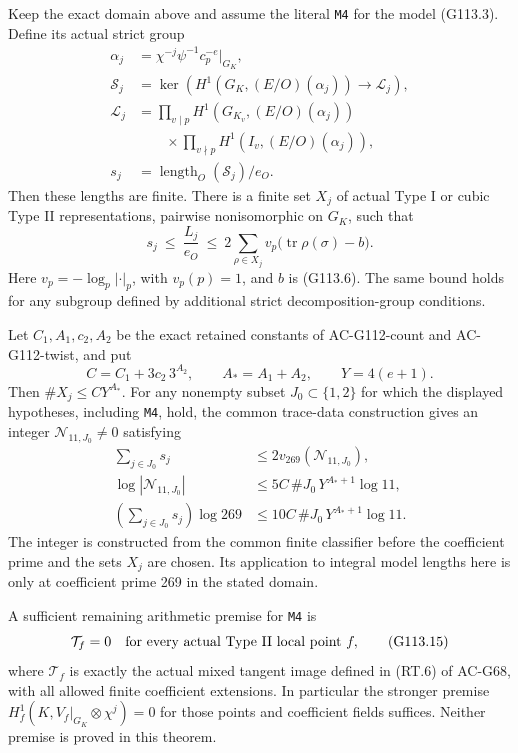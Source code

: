 \begin{theorem}
\label{thm:G113-bound}
Keep the exact domain above and assume the literal \texttt{M4}
for the model (G113.3).  Define its actual strict group
\[
 \begin{split}
 \alpha_j&=\chi^{-j}\psi^{-1}c_p^{-e}|_{G_K},\\
 \mathcal S_j&=\ker\left(H^1(G_K,(E/O)(\alpha_j))
                         \longrightarrow\mathcal L_j\right),\\
 \mathcal L_j&=\prod_{v\mid p}H^1(G_{K_v},(E/O)(\alpha_j))\\
 &\qquad\times\prod_{v\nmid p}H^1(I_v,(E/O)(\alpha_j)),\\
 s_j&=\operatorname{length}_O(\mathcal S_j)/e_O.
 \end{split}
 \tag{G113.11}
\]
Then these lengths are finite.  There is a finite set \(X_j\)
of actual Type I or cubic Type II representations, pairwise
nonisomorphic on \(G_K\), such that
\[
 s_j\ \le\ \frac{L_j}{e_O}\ \le\
 2\sum_{\rho\in X_j}
      v_p\bigl(\operatorname{tr}\rho(\sigma)-b\bigr).
 \tag{G113.12}
\]
Here \(v_p=-\log_p|\cdot|_p\), with \(v_p(p)=1\),
and \(b\) is (G113.6).  The same bound holds for any subgroup
defined by additional strict decomposition-group conditions.

Let \(C_1,A_1,c_2,A_2\) be the exact retained constants of
AC-G112-count and AC-G112-twist, and put
\[
       C=C_1+3c_2\,3^{A_2},\qquad
       A_*=A_1+A_2,\qquad Y=4(e+1).
 \tag{G113.13}
\]
Then \(\#X_j\le C Y^{A_*}\).  For any nonempty subset
\(J_0\subset\{1,2\}\) for which the displayed hypotheses,
including \texttt{M4}, hold, the common trace-data construction
gives an integer \(\mathcal N_{11,J_0}\ne0\) satisfying
\[
 \begin{split}
 \sum_{j\in J_0}s_j
       &\le2v_{269}(\mathcal N_{11,J_0}),\\
 \log|\mathcal N_{11,J_0}|
       &\le5C\,\#J_0\,Y^{A_*+1}\log11,\\
 \left(\sum_{j\in J_0}s_j\right)\log269
       &\le10C\,\#J_0\,Y^{A_*+1}\log11.
 \end{split}
 \tag{G113.14}
\]
The integer is constructed from the common finite classifier before
the coefficient prime and the sets \(X_j\) are chosen.  Its
application to integral model lengths here is only at coefficient
prime 269 in the stated domain.

A sufficient remaining arithmetic premise for \texttt{M4} is
\[
      \mathcal T_f=0
      \quad\hbox{for every actual Type II local point }f,
 \tag{G113.15}
\]
where \(\mathcal T_f\) is exactly the actual mixed tangent image
defined in (RT.6) of AC-G68, with all allowed finite coefficient
extensions.  In particular the stronger premise
\(H_f^1(K,V_f|_{G_K}\otimes\chi^j)=0\) for those points
and coefficient fields suffices.  Neither premise is proved in
this theorem.
\end{theorem}

